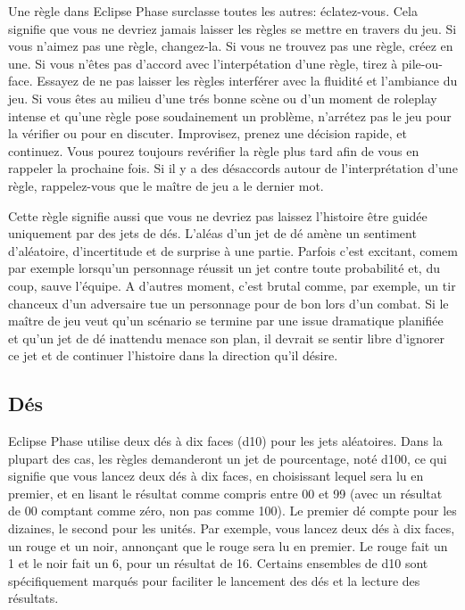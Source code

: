 Une règle dans Eclipse Phase surclasse toutes les autres: éclatez-vous. Cela signifie que vous ne devriez jamais laisser les règles se mettre en travers du jeu. Si vous n'aimez pas une règle, changez-la. Si vous ne trouvez pas une règle, créez en une. Si vous n'êtes pas d'accord avec l'interpétation d'une règle, tirez à pile-ou-face. Essayez de ne pas laisser les règles interférer avec la fluidité et l'ambiance du jeu. Si vous êtes au milieu d'une trés bonne scène ou d'un moment de roleplay intense et qu'une règle pose soudainement un problème, n'arrétez pas le jeu pour la vérifier ou pour en discuter. Improvisez, prenez une décision rapide, et continuez. Vous pourez toujours revérifier la règle plus tard afin de vous en rappeler la prochaine fois. Si il y a des désaccords autour de l'interprétation d'une règle, rappelez-vous que le maître de jeu a le dernier mot. 

Cette règle signifie aussi que vous ne devriez pas laissez l'histoire être guidée uniquement par des jets de dés. L'aléas d'un jet de dé amène un sentiment d'aléatoire, d'incertitude et de surprise à une partie. Parfois c'est excitant, comem par exemple lorsqu'un personnage réussit un jet contre toute probabilité et, du coup, sauve l'équipe. A d'autres moment, c'est brutal comme, par exemple, un tir chanceux d'un adversaire tue un personnage pour de bon lors d'un combat. Si le maître de jeu veut qu'un scénario se termine par une issue dramatique planifiée et qu'un jet de dé inattendu menace son plan, il devrait se sentir libre d'ignorer ce jet et de continuer l'histoire dans la direction qu'il désire. 

\subsection{Dés} \label{sec:dice-1} 

Eclipse Phase utilise deux dés à dix faces (d10) pour les jets aléatoires. Dans la plupart des cas, les règles demanderont un jet de pourcentage, noté d100, ce qui signifie que vous lancez deux dés à dix faces, en choisissant lequel sera lu en premier, et en lisant le résultat comme compris entre 00 et 99 (avec un résultat de 00 comptant comme zéro, non pas comme 100). Le premier dé compte pour les dizaines, le second pour les unités. Par exemple, vous lancez deux dés à dix faces, un rouge et un noir, annonçant que le rouge sera lu en premier. Le rouge fait un 1 et le noir fait un 6, pour un résultat de 16. Certains ensembles de d10 sont spécifiquement marqués pour faciliter le lancement des dés et la lecture des résultats. 


